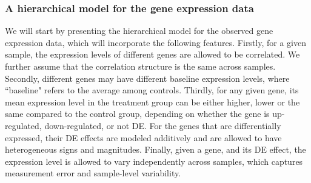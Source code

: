 \documentclass[a4,center,fleqn]{NAR}
\begin{document}
	\subsubsection{A hierarchical model for the gene expression data}\label{subsection:YModel}
	We will start by presenting the hierarchical model for the observed gene expression data, which
	will incorporate the following features. 
	Firstly, for a given sample, the expression levels of different genes are allowed to be
	correlated. We further assume that the correlation structure is the same across samples. Secondly,
	different genes may have different baseline expression levels, where ``baseline" refers to the
	average among controls. Thirdly, for any given gene, its mean expression level in the treatment
	group can be either higher, lower or the same compared to the control group, depending on whether
	the gene is up-regulated, down-regulated, or not DE. For the genes that are differentially
	expressed, their DE effects are modeled additively and are allowed to have heterogeneous signs and
	magnitudes. Finally, given a gene, and its DE effect, the expression level is allowed to vary
	independently across samples, which captures measurement error and sample-level variability.
	
\end{document}
